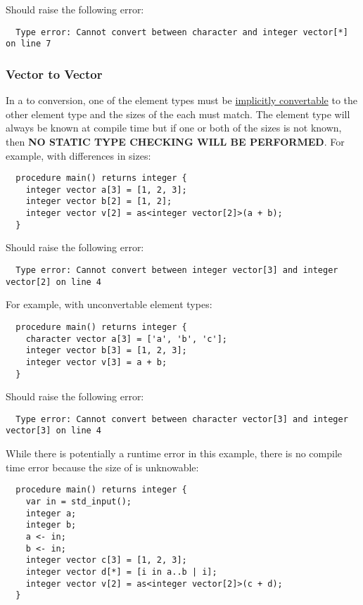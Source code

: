 \documentclass[../gazprea.tex]{subfiles}
\begin{document}
Should raise the following error:
\begin{lstlisting}
  Type error: Cannot convert between character and integer vector[*] on line 7
\end{lstlisting}

\subsubsection{Vector to Vector}
\label{sssec:error_ops_vtov}
In a  to  conversion, one of the element types must be
\hyperref[typePromotion]{implicitly convertable} to the other element type and the sizes of the
each  must match. The element type will always be known at compile time but if one or
both of the sizes is not known, then \textbf{NO STATIC TYPE CHECKING WILL BE PERFORMED}. For
example, with differences in sizes:
\begin{lstlisting}
  procedure main() returns integer {
    integer vector a[3] = [1, 2, 3];
    integer vector b[2] = [1, 2];
    integer vector v[2] = as<integer vector[2]>(a + b);
  }
\end{lstlisting}

Should raise the following error:
\begin{lstlisting}
  Type error: Cannot convert between integer vector[3] and integer vector[2] on line 4
\end{lstlisting}

For example, with unconvertable element types:
\begin{lstlisting}
  procedure main() returns integer {
    character vector a[3] = ['a', 'b', 'c'];
    integer vector b[3] = [1, 2, 3];
    integer vector v[3] = a + b;
  }
\end{lstlisting}

Should raise the following error:
\begin{lstlisting}
  Type error: Cannot convert between character vector[3] and integer vector[3] on line 4
\end{lstlisting}

While there is potentially a runtime error in this example, there is no compile time error because
the size of  is unknowable:
\begin{lstlisting}
  procedure main() returns integer {
    var in = std_input();
    integer a;
    integer b;
    a <- in;
    b <- in;
    integer vector c[3] = [1, 2, 3];
    integer vector d[*] = [i in a..b | i];
    integer vector v[2] = as<integer vector[2]>(c + d);
  }
\end{lstlisting}
\end{document}
